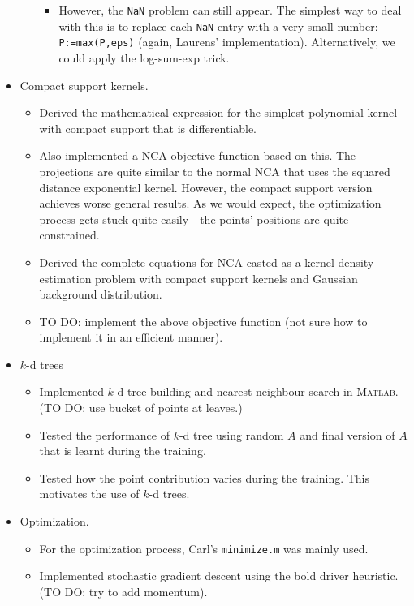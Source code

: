 \documentclass[]{article}
\begin{document}
\begin{itemize}
\begin{itemize}
\begin{itemize}
          \item However, the \texttt{NaN} problem can still appear. The simplest way to deal with this is to replace each \texttt{NaN} entry with a very small number: \texttt{P:=max(P,eps)} (again, Laurens' implementation). Alternatively, we could apply the log-sum-exp trick.
        \end{itemize}
    \end{itemize}
    \item Compact support kernels. 
    \begin{itemize}
      \item Derived the mathematical expression for the simplest polynomial kernel with compact support that is differentiable.
      \item Also implemented a NCA objective function based on this. The projections are quite similar to the normal NCA that uses the squared distance exponential kernel. However, the compact support version achieves worse general results. As we would expect, the optimization process gets stuck quite easily---the points' positions are quite constrained.
      \item Derived the complete equations for NCA casted as a kernel-density estimation problem with compact support kernels and Gaussian background distribution. 
      \item TO DO: implement the above objective function (not sure how to implement it in an efficient manner).
    \end{itemize} 
    \item $k$-d trees
      \begin{itemize}
      \item Implemented $k$-d tree building and nearest neighbour search in \textsc{Matlab}. (TO DO: use bucket of points at leaves.) 
      \item Tested the performance of $k$-d tree using random $A$ and final version of $A$ that is learnt during the training. 
      \item Tested how the point contribution varies during the training. This motivates the use of $k$-d trees. 
      \end{itemize}
    \item Optimization.
      \begin{itemize}
      	\item For the optimization process, Carl's \texttt{minimize.m} was mainly used. 
        \item Implemented stochastic gradient descent using the bold driver heuristic. (TO DO: try to add momentum).

\end{itemize}
\end{itemize}
\end{document}
